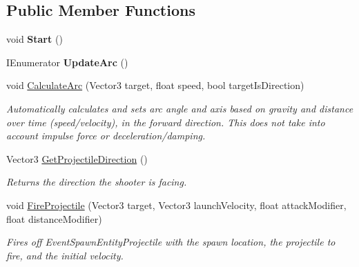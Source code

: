 \subsection*{Public Member Functions}
\begin{DoxyCompactItemize}
\item 
\hypertarget{class_skyrates_1_1_mono_1_1_shooter_a41f3c5e8c03befce02f57ad9b11ec914}{void {\bfseries Start} ()}\label{class_skyrates_1_1_mono_1_1_shooter_a41f3c5e8c03befce02f57ad9b11ec914}

\item 
\hypertarget{class_skyrates_1_1_mono_1_1_shooter_a36d20e8cd473fe5e9c49342d1f4a33e5}{I\-Enumerator {\bfseries Update\-Arc} ()}\label{class_skyrates_1_1_mono_1_1_shooter_a36d20e8cd473fe5e9c49342d1f4a33e5}

\item 
void \hyperlink{class_skyrates_1_1_mono_1_1_shooter_a327d02dace8d3388b098c83c011bf41d}{Calculate\-Arc} (Vector3 target, float speed, bool target\-Is\-Direction)
\begin{DoxyCompactList}\small\item\em Automatically calculates and sets arc angle and axis based on gravity and distance over time (speed/velocity), in the forward direction. This does not take into account impulse force or deceleration/damping. \end{DoxyCompactList}\item 
Vector3 \hyperlink{class_skyrates_1_1_mono_1_1_shooter_a170280e49b56961d0211a4c611f7f54b}{Get\-Projectile\-Direction} ()
\begin{DoxyCompactList}\small\item\em Returns the direction the shooter is facing. \end{DoxyCompactList}\item 
void \hyperlink{class_skyrates_1_1_mono_1_1_shooter_adfc8e2ba195adbe98c86dfc6b6e07ab5}{Fire\-Projectile} (Vector3 target, Vector3 launch\-Velocity, float attack\-Modifier, float distance\-Modifier)
\begin{DoxyCompactList}\small\item\em Fires off Event\-Spawn\-Entity\-Projectile with the spawn location, the projectile to fire, and the initial velocity. \end{DoxyCompactList}\end{DoxyCompactItemize}
